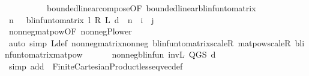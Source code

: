 \begin{isabellebody}
\ \ \ \ \ \ \ \ \ \ bounded{\isacharunderscore}{\kern0pt}linear{\isacharunderscore}{\kern0pt}compose{\isacharbrackleft}{\kern0pt}OF\ bounded{\isacharunderscore}{\kern0pt}linear{\isacharunderscore}{\kern0pt}blinfun{\isacharunderscore}{\kern0pt}to{\isacharunderscore}{\kern0pt}matrix{\isacharbrackright}{\kern0pt}{\isacharparenright}{\kern0pt}\isanewline
\ \ \ \ \isamarkupfalse%
\ {\isachardoublequoteopen}{\isasymAnd}n{\isachardot}{\kern0pt}\ {}\ {\isasymle}\ blinfun{\isacharunderscore}{\kern0pt}to{\isacharunderscore}{\kern0pt}matrix\ {\isacharparenleft}{\kern0pt}{\isacharparenleft}{\kern0pt}l\ {\isacharasterisk}{\kern0pt}\isactrlsub R\ {\isasymP}\isactrlsub L\ d{\isacharparenright}{\kern0pt}\ {\isacharcircum}{\kern0pt}{\isacharcircum}{\kern0pt}\ n{\isacharparenright}{\kern0pt}\ {\isachardollar}{\kern0pt}\ i\ {\isachardollar}{\kern0pt}\ j{\isachardoublequoteclose}\isanewline
\ \ \ \ \ \ \isamarkupfalse%
\ nonneg{\isacharunderscore}{\kern0pt}matpow{\isacharbrackleft}{\kern0pt}OF\ nonneg{\isacharunderscore}{\kern0pt}P{\isacharunderscore}{\kern0pt}lower{\isacharbrackright}{\kern0pt}\isanewline
\ \ \ \ \ \ \isamarkupfalse%
\ {\isacharparenleft}{\kern0pt}auto\ simp{\isacharcolon}{\kern0pt}\ {\isasymP}\isactrlsub L{\isacharunderscore}{\kern0pt}def\ nonneg{\isacharunderscore}{\kern0pt}matrix{\isacharunderscore}{\kern0pt}nonneg\ blinfun{\isacharunderscore}{\kern0pt}to{\isacharunderscore}{\kern0pt}matrix{\isacharunderscore}{\kern0pt}scaleR\ matpow{\isacharunderscore}{\kern0pt}scaleR\ blinfun{\isacharunderscore}{\kern0pt}to{\isacharunderscore}{\kern0pt}matrix{\isacharunderscore}{\kern0pt}matpow{\isacharparenright}{\kern0pt}\isanewline
\ \ \isamarkupfalse%
\isanewline
\ \ \isamarkupfalse%
\ {\isachardoublequoteopen}nonneg{\isacharunderscore}{\kern0pt}blinfun\ {\isacharparenleft}{\kern0pt}inv\isactrlsub L\ {\isacharparenleft}{\kern0pt}Q{\isacharunderscore}{\kern0pt}GS\ d{\isacharparenright}{\kern0pt}{\isacharparenright}{\kern0pt}{\isachardoublequoteclose}\isanewline
\ \ \ \ \isamarkupfalse%
\ {\isacharparenleft}{\kern0pt}simp\ add{\isacharcolon}{\kern0pt}\ {\isacharasterisk}{\kern0pt}\ Finite{\isacharunderscore}{\kern0pt}Cartesian{\isacharunderscore}{\kern0pt}Product{\isachardot}{\kern0pt}less{\isacharunderscore}{\kern0pt}eq{\isacharunderscore}{\kern0pt}vec{\isacharunderscore}{\kern0pt}def{\isacharparenright}{\kern0pt}\isanewline
{}\isamarkupfalse%
%
\endisatagproof
{\isafoldproof}%
%
\isadelimproof
\isanewline
%
\endisadelimproof
\isanewline
{}\isamarkupfalse%

\end{isabellebody}
